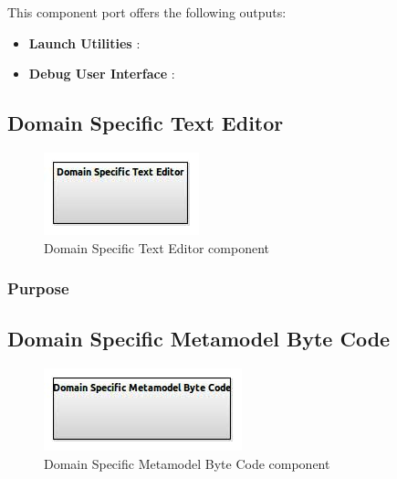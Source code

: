 \documentclass{gemoc} %
\begin{document}
This component port offers the following outputs:
\begin{itemize}
  \item \textbf{Launch Utilities} :
  \item \textbf{Debug User Interface} :
\end{itemize}

\subsection{Domain Specific Text Editor}

\begin{figure}[htp]
	\begin{center}
	\includegraphics*[trim=0.0cm 0.0cm 0cm 0.0cm, clip=true, scale=1.0]{../images/generated/Generated_Domain Specific Text Editor.jpg}
	\caption{Domain Specific Text Editor component}
	\end{center}
\end{figure}

\subsubsection{Purpose}



\subsection{Domain Specific Metamodel Byte Code}

\begin{figure}[htp]
	\begin{center}
	\includegraphics*[trim=0.0cm 0.0cm 0cm 0.0cm, clip=true, scale=1.0]{../images/generated/Generated_Domain Specific Metamodel Byte Code.jpg}
	\caption{Domain Specific Metamodel Byte Code component}
	\end{center}
\end{figure}
\end{document}
